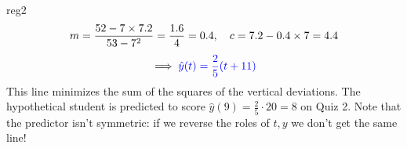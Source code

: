 \begin{example}{}{reg2}
	\begin{gather*}
		m=\frac{52-7\times 7.2}{53-7^2}= \frac{1.6}{4} =0.4,\quad c=7.2-0.4\times 7=4.4\\[3pt]
		\implies \mathcolor{Blue}{\hat y(t)=\frac 25(t+11)}
	\end{gather*}
	This line minimizes the sum of the squares of the \textcolor{mGreen}{vertical deviations.} The hypothetical student is predicted to score $\hat y(9)=\frac 25\cdot 20=8$ on Quiz 2.\smallbreak
	Note that the predictor isn't symmetric: if we reverse the roles of $t,y$ we don't get the same line!
\end{example}


\vfil\vfil



